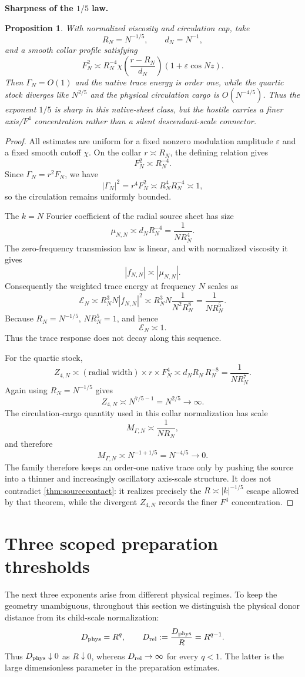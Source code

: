 \documentclass[11pt]{article}
\newtheorem{proposition}[theorem]{Proposition}
\theoremstyle{definition}\newtheorem{definition}[theorem]{Definition}
\theoremstyle{remark}\newtheorem{remark}[theorem]{Remark}
\begin{document}
\medskip
\noindent\textbf{Sharpness of the $1/5$ law.}
\begin{proposition}
With normalized viscosity and circulation cap, take
\[
R_N=N^{-1/5},\qquad d_N=N^{-1},
\]
and a smooth collar profile satisfying
\[
F_N^2\asymp R_N^{-4}\chi\!\left(\frac{r-R_N}{d_N}\right)(1+\varepsilon\cos Nz).
\]
Then $\Gamma_N=O(1)$ and the native trace energy is order one, while the quartic stock diverges like $N^{2/5}$ and the physical circulation cargo is $O(N^{-4/5})$. Thus the exponent $1/5$ is sharp in this native-sheet class, but the hostile carries a finer axis/$F^4$ concentration rather than a silent descendant-scale connector.
\end{proposition}
\begin{proof}
All estimates are uniform for a fixed nonzero modulation amplitude $\varepsilon$ and a fixed smooth cutoff $\chi$.
On the collar $r\asymp R_N$, the defining relation gives
\[
 F_N^2\asymp R_N^{-4}.
\]
Since $\Gamma_N=r^2F_N$, we have
\[
 |\Gamma_N|^2=r^4F_N^2\asymp R_N^4R_N^{-4}\asymp1,
\]
so the circulation remains uniformly bounded.

The $k=N$ Fourier coefficient of the radial source sheet has size
\[
 \mu_{N,N}
 \asymp d_NR_N^{-4}
 =\frac1{NR_N^4}.
\]
The zero-frequency transmission law is linear, and with normalized viscosity it gives
\[
 |f_{N,N}|\asymp |\mu_{N,N}|.
\]
Consequently the weighted trace energy at frequency $N$ scales as
\[
 \mathcal E_N
 \asymp R_N^3N|f_{N,N}|^2
 \asymp R_N^3N\frac1{N^2R_N^8}
 =\frac1{NR_N^5}.
\]
Because $R_N=N^{-1/5}$, $NR_N^5=1$, and hence
\[
 \mathcal E_N\asymp1.
\]
Thus the trace response does not decay along this sequence.

For the quartic stock,
\[
 Z_{4,N}
 \asymp (\text{radial width})\times r\times F_N^4
 \asymp d_NR_N\,R_N^{-8}
 =\frac1{NR_N^7}.
\]
Again using $R_N=N^{-1/5}$ gives
\[
 Z_{4,N}\asymp N^{7/5-1}=N^{2/5}\to\infty.
\]
The circulation-cargo quantity used in this collar normalization has scale
\[
 M_{\Gamma,N}\asymp \frac1{NR_N},
\]
and therefore
\[
 M_{\Gamma,N}\asymp N^{-1+1/5}=N^{-4/5}\to0.
\]
The family therefore keeps an order-one native trace only by pushing the source into a thinner and increasingly oscillatory axis-scale structure.  It does not contradict \cref{thm:sourcecontact}: it realizes precisely the $R\asymp |k|^{-1/5}$ escape allowed by that theorem, while the divergent $Z_{4,N}$ records the finer $F^4$ concentration.
\end{proof}

\section{Three scoped preparation thresholds}
The next three exponents arise from different physical regimes.  To keep the
geometry unambiguous, throughout this section we distinguish the physical
donor distance from its child-scale normalization:
\[
 D_{\rm phys}=R^q,
 \qquad
 D_{\rm rel}:=\frac{D_{\rm phys}}R=R^{q-1}.
\]
Thus $D_{\rm phys}\downarrow0$ as $R\downarrow0$, whereas $D_{\rm rel}\to\infty$
for every $q<1$.  The latter is the large dimensionless parameter in the
preparation estimates.
\end{document}
